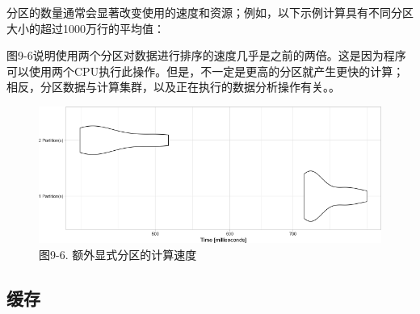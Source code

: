 \documentclass[
]{article}
\newenvironment{Shaded}{\begin{snugshade}}{\end{snugshade}}
\newcommand{\DataTypeTok}[1]{\textcolor[rgb]{0.13,0.29,0.53}{#1}}
\newcommand{\DecValTok}[1]{\textcolor[rgb]{0.00,0.00,0.81}{#1}}
\newcommand{\KeywordTok}[1]{\textcolor[rgb]{0.13,0.29,0.53}{\textbf{#1}}}
\newcommand{\NormalTok}[1]{#1}
\newcommand{\OperatorTok}[1]{\textcolor[rgb]{0.81,0.36,0.00}{\textbf{#1}}}
\newcommand{\StringTok}[1]{\textcolor[rgb]{0.31,0.60,0.02}{#1}}
\begin{document}
分区的数量通常会显著改变使用的速度和资源；例如，以下示例计算具有不同分区大小的超过1000万行的平均值：

\begin{Shaded}
\end{Shaded}

图9-6说明使用两个分区对数据进行排序的速度几乎是之前的两倍。这是因为程序可以使用两个CPU执行此操作。但是，不一定是更高的分区就产生更快的计算；相反，分区数据与计算集群，以及正在执行的数据分析操作有关。。

\begin{figure}
\centering
\includegraphics{figures/9_6.png}
\caption{图9-6. 额外显式分区的计算速度}
\end{figure}

\hypertarget{ux7f13ux5b58-1}{%
\subsection{缓存}\label{ux7f13ux5b58-1}}
\end{document}
